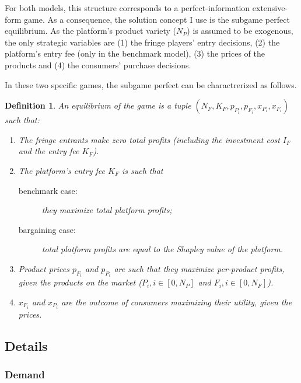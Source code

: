 \documentclass[a4paper]{article}
\newtheorem{definition}{Definition}
\begin{document}
For both models, this structure corresponds to a perfect-information extensive-form game.
As a consequence, the solution concept I use is the subgame perfect equilibrium.
As the platform's product variety ($N_P$) is assumed to be exogenous, the only strategic variables are (1) the fringe players' entry decisions, (2) the platform's entry fee (only in the benchmark model), (3) the prices of the products and (4) the consumers' purchase decisions.

In these two specific games, the subgame perfect can be charactrerized as follows.
\begin{definition}
    \label{def:equilibrium}
    An equilibrium of the game is a tuple $(N_F, K_F, p_{P_i}, p_{F_i}, x_{P_i}, x_{F_i})$ such that:
    \begin{enumerate}
        \item The fringe entrants make zero total profits (including the investment cost $I_F$ and the entry fee $K_F$).
        \item The platform's entry fee $K_F$ is such that
        \begin{description}
            \item[benchmark case:] they maximize total platform profits;
            \item[bargaining case:] total platform profits are equal to the Shapley value of the platform.
        \end{description}
        \item Product prices $p_{F_i}$ and $p_{P_i}$ are such that they maximize per-product profits, given the products on the market ($P_i, i \in [0, N_P]$ and $F_i, i \in [0, N_F]$).
        \item $x_{F_i}$ and $x_{P_i}$ are the outcome of consumers maximizing their utility, given the prices.
    \end{enumerate}
\end{definition}

\subsection{Details}
\label{sec:model_details}

\subsubsection{Demand}
\label{sec:demand}
\end{document}
